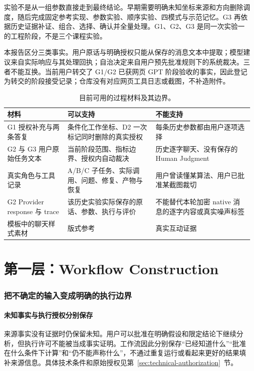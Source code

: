 \documentclass[11pt,a4paper]{article}
\begin{document}
实验不是从一组参数直接走到最终结论。早期需要明确未知坐标来源和方向删除调度，随后完成固定参考实现、参数实验、顺序实验、四模式与示范记忆。G3 再依据历史证据补证、组合、选择、确认并全量处理。G1、G2、G3 是同一次实验一的工程阶段，不是三个课程实验。

本报告区分三类事实。用户原话与明确授权只能从保存的消息文本中提取；模型建议来自实际响应与其处理回执；自治决定来自用户预先批准规则下的系统裁决。三者不能互换。当前用户转交了 G1/G2 已获网页 GPT 阶段验收的事实，因此登记为转交的阶段接受记录；仓库没有对应网页工具日志或截图，不补造附件。

\begin{table}[H]\centering\small\caption{目前可用的过程材料及其边界。}\begin{tabularx}{\linewidth}{@{}p{30mm}Y Y@{}}\toprule 材料 & 可以支持 & 不能支持 \\ \midrule
G1 授权补充与两条答复 & 条件化工作坐标、D2 一次标记同时删除的真实授权 & 每条历史参数都由用户逐项选择 \\
G2 与 G3 用户原始任务文本 & 当前阶段范围、指标边界、授权内自动裁决 & 历史逐字聊天、没有保存的 Human Judgment \\
真实角色与工具记录 & A/B/C 子任务、实际调用、问题、修复、产物与恢复 & 用户曾读懂某算法、用户已批准某截图裁切 \\
G2 Provider response 与 trace & 该历史实验实际保存的原话、参数、执行与评价 & 不能替代本轮加密 native 消息的逐字内容或真实噪声标签 \\
模板中的聊天样式素材 & 版式参考 & 真实互动证据 \\
\bottomrule\end{tabularx}\end{table}

\part*{第一层：Workflow Construction}

\section{把不确定的输入变成明确的执行边界}
\subsection{未知事实与执行授权分别保存}
来源事实没有证据时仍保留未知。用户可以批准在明确假设和限定结论下继续分析，但执行许可不能被当成事实证明。工作流因此分别保存“已经知道什么”“批准在什么条件下计算”和“仍不能声称什么”，不通过重复运行或看起来更好的结果填补来源信息。具体技术条件和原始授权见第~\ref{sec:technical-authorization}~节。
\end{document}
